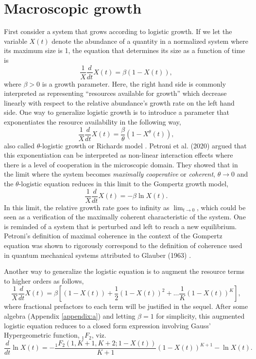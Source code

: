 \documentclass{article}
\begin{document}
\section{Macroscopic growth}
\label{sec:macro}

First consider a system that grows according to logistic growth. If we let the variable $X(t)$ denote the abundance of a quantity in a normalized system where its maximum size is 1, the equation that determines its size as a function of time is
\begin{equation}
  \frac{1}{X}\frac{d}{dt} X(t) = \beta (1 - X(t)),
\end{equation}
where $\beta>0$ is a growth parameter. Here, the right hand side is commonly interpreted as representing ``resources available for growth'' which decrease linearly with respect to the relative abundance's growth rate on the left hand side. One way to generalize logistic growth is to introduce a parameter that exponentiates the resource availability in the following way,
\begin{equation}
\label{eq:Rich}
  \frac{1}{X}\frac{d}{dt} X(t) = \frac{\beta}{\theta} (1 - X^{\theta}(t)),
\end{equation}
also called $\theta$-logistic growth or Richards model \citep{richards1959flexible}. Petroni et al. (2020) argued that this exponentiation can be interpreted as non-linear interaction effects where there is a level of cooperation in the microscopic domain. They showed that in the limit where the system becomes \textit{maximally cooperative} or \textit{coherent}, $\theta\rightarrow 0$ and the $\theta$-logistic equation reduces in this limit to the Gompertz growth model,
 \begin{equation}
 \label{eq:Gomp}
  \frac{1}{X}\frac{d}{dt} X(t) = - \beta \ln X(t).
\end{equation}
In this limit, the relative growth rate goes to infinity as $\lim_{t\to 0}$, which could be seen as a verification of the maximally coherent characteristic of the system. One is reminded of a system that is perturbed and left to reach a new equilibrium. Petroni's definition of maximal coherence in the context of the Gompertz equation was shown to rigorously correspond to the definition of coherence used in quantum mechanical systems \cite{molski2003coherent} attributed to Glauber (1963) \cite{glauber1963coherent}.

Another way to generalize the logistic equation is to augment the resource terms to higher orders as follows,
\begin{equation}
  \frac{1}{X}\frac{d}{dt} X(t) = \beta \left[(1 - X(t)) + \frac{1}{2}(1 - X(t))^2 + ... \frac{1}{K}(1 - X(t))^K\right],
\end{equation}
where fractional prefactors to each term will be justified in the sequel.
After some algebra (Appendix \ref{appendix:a}) and letting $\beta=1$ for simplicity, this augmented logistic equation reduces to a closed form expression involving Gauss' Hypergeometric function, ${}_1F_{2}$, viz.
\begin{equation}
 \label{eq:modLogistic}
\frac{d}{dt}\ln{X(t)} = - \frac{{}_{1}F_{2}({1,K+1,K+2;1-X(t)})}{K+1}(1-X(t))^{K+1} - \ln{X(t)}.
 \end{equation}
\end{document}
